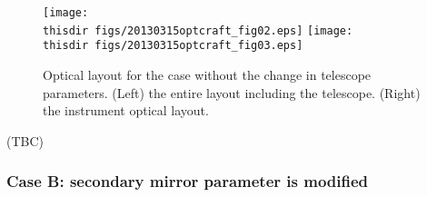\begin{figure}[!ht]
\centerline{
\texttt{[image: \\thisdir figs/20130315optcraft\_fig02.eps]}
\texttt{[image: \\thisdir figs/20130315optcraft\_fig03.eps]}
}
\caption{Optical layout for the case without the change in telescope
 parameters. (Left) the entire layout including the telescope. (Right)
 the instrument optical layout.
}
\label{fig:optcraft2013_fig02}
\end{figure}

(TBC)



\subsubsection{Case B: secondary mirror parameter is modified}


